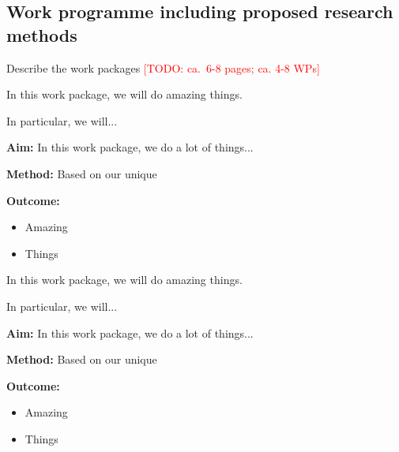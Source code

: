 \documentclass[american,firsttime]{dfgproposal}
\newcommand{\todo}[1]{\xspace{\textcolor{red}{[TODO: #1]}}\xspace}
\begin{document}
	\subsection{Work programme including proposed research methods}
	Describe the work packages
	\todo{ca.\ 6-8 pages; ca. 4-8 WPs}
	
	\begin{workpackage}
		In this work package, we will do amazing things.
		
		In particular, we will...
		\blindtext
	\end{workpackage}
	\begin{wpsummary}
		\textbf{Aim:}
		In this work package, we do a lot of things...
		
		\textbf{Method:}
		Based on our unique 
		
		\textbf{Outcome:}
		\begin{itemize}
			\item Amazing
			\item Things
		\end{itemize}
	\end{wpsummary}
	
	\begin{workpackage}
		In this work package, we will do amazing things.
		
		In particular, we will...
		\blindtext
	\end{workpackage}
	\begin{wpsummary}
		\textbf{Aim:}
		In this work package, we do a lot of things...
		
		\textbf{Method:}
		Based on our unique 
		
		\textbf{Outcome:}
		\begin{itemize}
			\item Amazing
			\item Things
		\end{itemize}
	\end{wpsummary}
	
	
\end{document}
